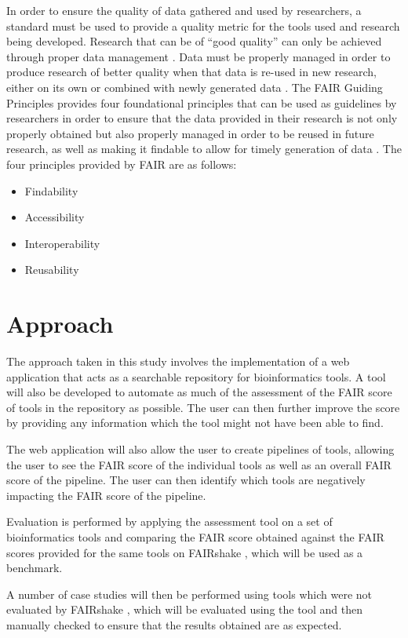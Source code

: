 \documentclass{cisfyp}
\begin{document}
In order to ensure the quality of data gathered and used by researchers, a standard must be used to provide a  quality metric for the tools used and research being developed. Research that can be of ``good quality'' can only be achieved through proper data management \cite{Wilkinson2016}. Data must be properly managed in order to produce research of better quality when that data is re-used in new research, either on its own or combined with newly generated data \cite{Wilkinson2016}. The FAIR Guiding Principles \cite{Wilkinson2016} provides four foundational principles that can be used as guidelines by researchers in order to ensure that the data provided in their research is not only properly obtained but also properly managed in order to be reused 
in future research, as well as making it findable to allow for timely generation of data \cite{Wilkinson2016}.
The four principles provided by FAIR are as follows:
\begin{itemize}
	\item Findability
	\item Accessibility
	\item Interoperability
	\item Reusability
\end{itemize}


\section{Approach}
The approach taken in this study involves the implementation of a web application that acts as a searchable repository for bioinformatics tools. A tool will also be developed to automate as much of the assessment of the FAIR score of tools in the repository as possible. The user can then further improve the score by providing any information which the tool might not have been able to find.

The web application will also allow the user to create pipelines of tools, allowing the user to see the FAIR score of the individual tools as well as an overall FAIR score of the pipeline. The user can then identify which tools are 
negatively impacting the FAIR score of the pipeline. 

Evaluation is performed by applying the assessment tool on a set of bioinformatics tools and comparing the FAIR score obtained against the FAIR scores provided for the same tools on FAIRshake \cite{FAIRshake}, which will be used as a benchmark. 

A number of case studies will then be performed using tools which were not evaluated by FAIRshake \cite{FAIRshake}, which will be evaluated using the tool and then manually checked to ensure that the results obtained are as expected.
\pagebreak
\end{document}
